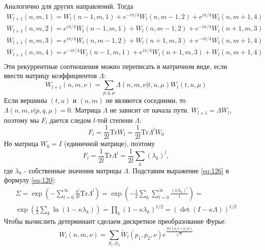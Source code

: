 \documentclass[a4paper,12pt]{article}
\theoremstyle{definition}
\theoremstyle{definition}
\theoremstyle{definition}
\begin{document}
Аналогично для других направлений. Тогда
\begin{equation}
  \label{eq:122}
\begin{array}{l}
W_{l+1}(n,m,1)=W_l(n-1,m,1)+e^{-i\pi/4} W_l(n,m-1,2)+e^{i\pi/4}W_l(n,m+1,4)\\
W_{l+1}(n,m,2)=e^{i\pi/4}W_l(n-1,m,1)+W_l(n,m-1,2)+e^{-i\pi/4}W_l(n+1,m,3)\\
W_{l+1}(n,m,3)=e^{i\pi/4}W_l(n,m-1,2)+W_l(n+1,m,3)+e^{-i\pi/4}W_l(n,m+1,4)\\
W_{l+1}(n,m,4)=e^{-i\pi/4}W_l(n-1,m,1)+e^{i\pi/4}W_l(n+1,m,3)+W_l(n,m+1,4)\\
\end{array}
\end{equation}
Эти рекуррентные соотношения можно переписать в матричном виде, если ввести матрицу коэффициентов $\Lambda$:
\begin{equation}
  \label{eq:124}
  W_{l+1}(n,m,\nu)=\sum_{p,q,\mu}\Lambda(n,m,\nu|t,u,\mu) W_l(t,u,\mu)
\end{equation}
Если вершины $(t,u)$ и $(n,m)$ не являются соседними, то $\Lambda(n,m,\nu|p,q,\mu)=0$. Матрица $\Lambda$ не зависит от начала пути. $W_{l+1}=\Lambda W_l$, поэтому мы $F_l$ дается следом $l$-той степени $\Lambda$:
\begin{equation}
  \label{eq:125}
  F_l=\frac{1}{2l}\mathrm{Tr} W_l=\frac{1}{2l}\mathrm{Tr} \Lambda^l W_0
\end{equation}
Но матрица $W_0=I$ (единичной матрице), поэтому
\begin{equation}
  \label{eq:126}
  F_l=\frac{1}{2l}\mathrm{Tr} \Lambda^l =\frac{1}{2l} \sum_k (\lambda_k)^l,
\end{equation}
где $\lambda_k$ - собственные значения матрицы $\Lambda$. Подставим выражение \eqref{eq:126} в формулу \eqref{eq:120}:
\begin{multline}
  \label{eq:127}
  \Sigma=\exp\left(-\sum_{l=0}^{\infty} \frac{\kappa^l}{2l}\mathrm{Tr}\Lambda^l\right)=\exp\left(-\frac{1}{2}\sum_k \sum_{l=0}^{\infty} \frac{(\kappa\lambda_k)^l}{l}\right)=\\
  \exp\left(\frac{1}{2}\sum_k \ln(1-\kappa\lambda_k)\right)=\prod_k(1-\kappa\lambda_k)^{1/2}=(\det(I-\kappa\Lambda))^{1/2}
\end{multline}
Чтобы вычислить детерминант сделаем дискретное преобразование Фурье:
\begin{equation}
  \label{eq:128}
  W_{l}(n,m,\nu)=\sum_{p_1,p_2} \tilde{W}_l(p_1,p_2,\nu) e^{\frac{2\pi i (p_1n+p_2m)}{\sqrt N}}
\end{equation}
\end{document}
